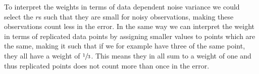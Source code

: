 \documentclass[a4paper, 11pt]{article}
\begin{document}
To interpret the weights in terms of data dependent noise variance we could select the $r$s such that they are small for noisy observations, making these observations count less in the error. In the same way we can interpret the weight in terms of replicated data points by assigning smaller values to points which are the same, making it such that if we for example have three of the same point, they all have a weight of $\sfrac{1}{3}$. This means they in all sum to a weight of one and thus replicated points does not count more than once in the error.
\end{document}
